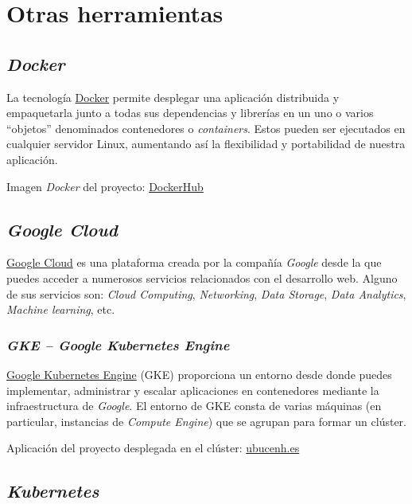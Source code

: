 \section{Otras herramientas}

\subsection{\emph{Docker}}

La tecnología \href{https://www.docker.com/}{Docker} permite desplegar
una aplicación distribuida y empaquetarla junto a todas sus dependencias
y librerías en un uno o varios ``objetos'' denominados contenedores o
\emph{containers}. Estos pueden ser ejecutados en cualquier servidor
Linux, aumentando así la flexibilidad y portabilidad de nuestra
aplicación.

Imagen \emph{Docker} del proyecto: \href{https://hub.docker.com/repository/docker/gcm1001/omeka_cenieh}{DockerHub}

\subsection{\emph{Google Cloud}}

\href{https://cloud.google.com/}{Google Cloud} es una plataforma creada
por la compañía \emph{Google} desde la que puedes acceder a numerosos
servicios relacionados con el desarrollo web. Alguno de sus servicios
son: \emph{Cloud Computing}, \emph{Networking}, \emph{Data Storage},
\emph{Data Analytics}, \emph{Machine learning}, etc.

\subsubsection{\emph{GKE -- Google Kubernetes Engine}}

\href{https://cloud.google.com/kubernetes-engine}{Google Kubernetes
Engine} (GKE) proporciona un entorno desde donde puedes implementar,
administrar y escalar aplicaciones en contenedores mediante la
infraestructura de \emph{Google}. El entorno de GKE consta de varias
máquinas (en particular, instancias de \emph{Compute Engine}) que se
agrupan para formar un clúster.

Aplicación del proyecto desplegada en el clúster: \href{ubucenh.es}{ubucenh.es}


\subsection{\emph{Kubernetes}}

